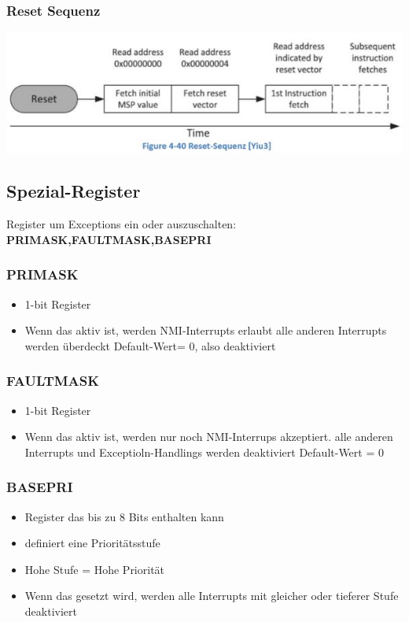 \subsubsection{Reset Sequenz}
     \includegraphics{images/resetsequenz}
\subsection{Spezial-Register}     
Register um Exceptions ein oder auszuschalten:\\
\textbf{\rightarrow PRIMASK,FAULTMASK,BASEPRI}
\begin{multicols}{2}
    \subsubsection{PRIMASK}
    \begin{itemize}
        \item 1-bit Register
        \item Wenn das aktiv ist, werden NMI-Interrupts erlaubt
        \subitem \rightarrow alle anderen Interrupts werden überdeckt
        \subitem \rightarrow Default-Wert= 0, also deaktiviert
    \end{itemize}
    
    \subsubsection{FAULTMASK}
    \begin{itemize}
        \item 1-bit Register
        \item Wenn das aktiv ist, werden nur noch NMI-Interrups akzeptiert.\newline
        alle anderen Interrupts und Exceptioln-Handlings werden deaktiviert
        \subitem \rightarrow Default-Wert = 0
    \end{itemize}
\end{multicols}

\subsubsection{BASEPRI}
\begin{itemize}
    \item Register das bis zu 8 Bits enthalten kann
    \item definiert eine Prioritätsstufe
    \item Hohe Stufe = Hohe Priorität
    \item Wenn das gesetzt wird, werden alle Interrupts mit gleicher oder tieferer Stufe deaktiviert
\end{itemize}

